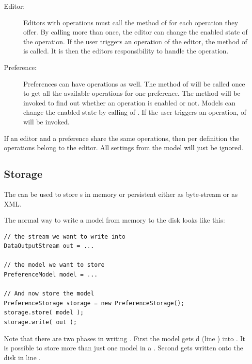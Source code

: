 \begin{description}
 \item[Editor:] Editors with operations must call the method  of \linebreak {} for each operation they offer. By calling  more than once, the editor can change the enabled state of the operation. If the user triggers an operation of the editor, the method  of  is called. It is then the editors responsibility to handle the operation.
 \item[Preference:] Preferences can have operations as well. The method \linebreak {} of  will be called once to get all the available operations for one preference. The method  will be invoked to find out whether an operation is enabled or not. Models can change the enabled state by calling  of \linebreak {}. If the user triggers an operation, \linebreak {} of  will be invoked.
\end{description}
If an editor and a preference share the same operations, then per definition the operations belong to the editor. All settings from the model will just be ignored.


\subsection{Storage}
The  can be used to store s in memory or persistent either as byte-stream or as XML.

The normal way to write a model from memory to the disk looks like this:
\begin{lstlisting}
// the stream we want to write into
DataOutputStream out = ...

// the model we want to store
PreferenceModel model = ...

// And now store the model
PreferenceStorage storage = new PreferenceStorage();
storage.store( model );
storage.write( out );
\end{lstlisting}
Note that there are two phases in writing . First the model gets d (line ) into . It is possible to store more than just one model in a . Second  gets written onto the disk in line .


